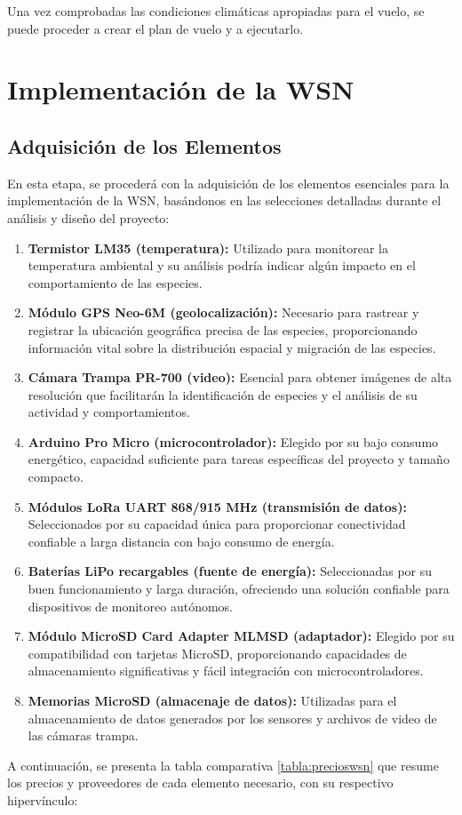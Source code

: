 Una vez comprobadas las condiciones climáticas apropiadas para el vuelo, se puede proceder a crear el plan de vuelo y a ejecutarlo.


















\section{Implementación de la WSN}
\subsection{Adquisición de los Elementos}
En esta etapa, se procederá con la adquisición de los elementos esenciales para la implementación de la WSN, basándonos en las selecciones detalladas durante el análisis y diseño del proyecto:
\begin{enumerate}
    \item \textbf{Termistor LM35 (temperatura):} Utilizado para monitorear la temperatura ambiental y su análisis podría indicar algún impacto en el comportamiento de las especies.
    \item \textbf{Módulo GPS Neo-6M (geolocalización):} Necesario para rastrear y registrar la ubicación geográfica precisa de las especies, proporcionando información vital sobre la distribución espacial y migración de las especies.
    \item \textbf{Cámara Trampa PR-700 (video): } Esencial para obtener imágenes de alta resolución que facilitarán la identificación de especies y el análisis de su actividad y comportamientos.
    \item \textbf{Arduino Pro Micro (microcontrolador):} Elegido por su bajo consumo energético, capacidad suficiente para tareas específicas del proyecto y tamaño compacto.
    \item \textbf{Módulos LoRa UART 868/915 MHz (transmisión de datos):} Seleccionados por su capacidad única para proporcionar conectividad confiable a larga distancia con bajo consumo de energía.
    \item \textbf{Baterías LiPo recargables (fuente de energía):} Seleccionadas por su buen funcionamiento y larga duración, ofreciendo una solución confiable para dispositivos de monitoreo autónomos.
    \item \textbf{Módulo MicroSD Card Adapter MLMSD (adaptador):} Elegido por su compatibilidad con tarjetas MicroSD, proporcionando capacidades de almacenamiento significativas y fácil integración con microcontroladores.
    \item \textbf{Memorias MicroSD (almacenaje de datos):} Utilizadas para el almacenamiento de datos generados por los sensores y archivos de video de las cámaras trampa.
\end{enumerate}
A continuación, se presenta la tabla comparativa \ref{tabla:precioswsn} que resume los precios y proveedores de cada elemento necesario, con su respectivo hipervínculo:

